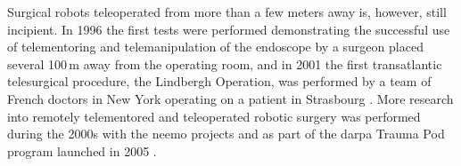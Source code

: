 Surgical robots teleoperated from more than a few meters away is, however, still incipient. In 1996 the first tests were performed demonstrating the successful use of telementoring and telemanipulation of the endoscope by a surgeon placed several 100\,m away from the operating room, %
%
%
and in 2001 the first transatlantic telesurgical procedure, the Lindbergh Operation, was performed by a team of French doctors in New York %
operating on a patient in Strasbourg \citep{bib:telesurg_history}. More research into remotely telementored and teleoperated robotic surgery was performed during the 2000s with the \gls{neemo} projects  %
%
and as part of the \gls{darpa} Trauma Pod program launched in 2005 \citep{bib:surgical_book,bib:docatadist}.




%
%

